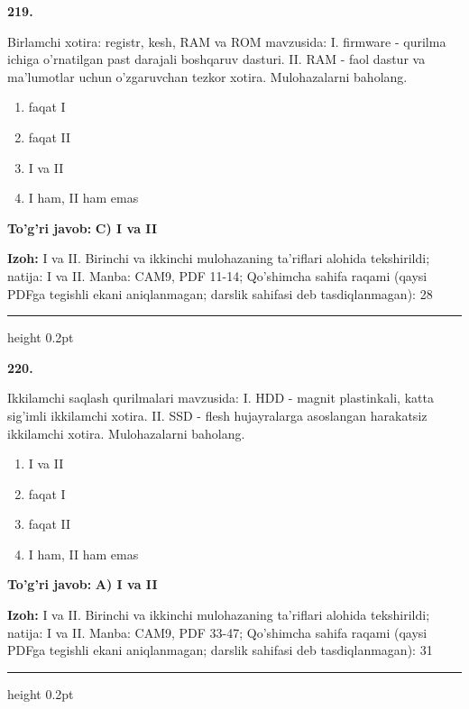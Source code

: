 \documentclass[10pt,a4paper]{article}
\begin{document}
{\bfseries\sffamily\color{ink} 219.}
\par
Birlamchi xotira: registr, kesh, RAM va ROM mavzusida: I. firmware - qurilma ichiga o'rnatilgan past darajali boshqaruv dasturi. II. RAM - faol dastur va ma'lumotlar uchun o'zgaruvchan tezkor xotira. Mulohazalarni baholang.
\begin{enumerate}[label=\Alph*),leftmargin=9mm]
\item faqat I
\item faqat II
\item I va II
\item I ham, II ham emas
\end{enumerate}
\begin{tcolorbox}[enhanced,breakable,colback=teal!4,colframe=teal!60!black,boxrule=0.45pt,arc=1.2mm,left=2.7mm,right=2.7mm,top=1.8mm,bottom=1.8mm,before skip=2mm,after skip=2mm]
{\bfseries\sffamily\color{teal}To'g'ri javob:} \textbf{C) I va II}
\par\smallskip
{\bfseries Izoh:} I va II. Birinchi va ikkinchi mulohazaning ta'riflari alohida tekshirildi; natija: I va II. Manba: CAM9, PDF 11-14; Qo'shimcha sahifa raqami (qaysi PDFga tegishli ekani aniqlanmagan; darslik sahifasi deb tasdiqlanmagan): 28
\end{tcolorbox}
\vspace{2mm}\hrule height 0.2pt\vspace{3mm}

{\bfseries\sffamily\color{ink} 220.}
\par
Ikkilamchi saqlash qurilmalari mavzusida: I. HDD - magnit plastinkali, katta sig'imli ikkilamchi xotira. II. SSD - flesh hujayralarga asoslangan harakatsiz ikkilamchi xotira. Mulohazalarni baholang.
\begin{enumerate}[label=\Alph*),leftmargin=9mm]
\item I va II
\item faqat I
\item faqat II
\item I ham, II ham emas
\end{enumerate}
\begin{tcolorbox}[enhanced,breakable,colback=teal!4,colframe=teal!60!black,boxrule=0.45pt,arc=1.2mm,left=2.7mm,right=2.7mm,top=1.8mm,bottom=1.8mm,before skip=2mm,after skip=2mm]
{\bfseries\sffamily\color{teal}To'g'ri javob:} \textbf{A) I va II}
\par\smallskip
{\bfseries Izoh:} I va II. Birinchi va ikkinchi mulohazaning ta'riflari alohida tekshirildi; natija: I va II. Manba: CAM9, PDF 33-47; Qo'shimcha sahifa raqami (qaysi PDFga tegishli ekani aniqlanmagan; darslik sahifasi deb tasdiqlanmagan): 31
\end{tcolorbox}
\vspace{2mm}\hrule height 0.2pt\vspace{3mm}
\end{document}
